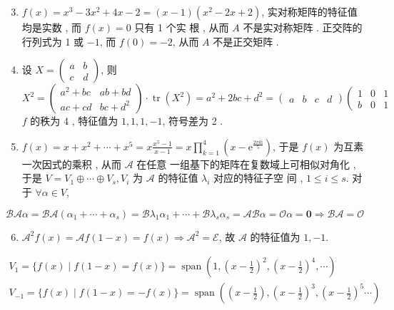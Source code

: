 \documentclass[10pt]{article}
\begin{document}
\begin{enumerate}
  \setcounter{enumi}{2}
  \item $f(x)=x^{3}-3 x^{2}+4 x-2=(x-1)\left(x^{2}-2 x+2\right)$,  实对称矩阵的特征值均是实数 ,  而  $f(x)=0$  只有  1  个实   根 ,  从而  $A$  不是实对称矩阵 .  正交阵的行列式为  1  或  $-1$,  而  $f(0)=-2$,  从而  $A$  不是正交矩阵 .

  \item  设  $X=\left(\begin{array}{ll}a & b \\ c & d\end{array}\right)$,  则  $X^{2}=\left(\begin{array}{cc}a^{2}+b c & a b+b d \\ a c+c d & b c+d^{2}\end{array}\right) \cdot \operatorname{tr}\left(X^{2}\right)=a^{2}+2 b c+d^{2}=\left(\begin{array}{llll}a & b & c & d\end{array}\right)\left(\begin{array}{ccc}1 & 0 & 1 \\ b & 0 & 1\end{array}\right.$ $f$  的秩为  4 ,  特征值为  $1,1,1,-1$,  符号差为  2 .

  \item $f(x)=x+x^{2}+\cdots+x^{5}=x \frac{x^{5}-1}{x-1}=x \prod_{k=1}^{4}\left(x-\mathrm{e}^{\frac{2 \pi k \mathrm{i}}{5}}\right)$,  于是  $f(x)$  为互素一次因式的乘积 ,  从而  $\mathscr{A}$  在任意   一组基下的矩阵在复数域上可相似对角化 ,  于是  $V=V_{1} \oplus \cdots \oplus V_{s}, V_{i}$  为  $\mathscr{A}$  的特征值  $\lambda_{i}$  对应的特征子空   间 , $1 \leq i \leq s$.  对于  $\forall \alpha \in V$,

\end{enumerate}
$$
\mathscr{B} \mathscr{A} \alpha=\mathscr{B} \mathscr{A}\left(\alpha_{1}+\cdots+\alpha_{s}\right)=\mathscr{B} \lambda_{1} \alpha_{1}+\cdots+\mathscr{B} \lambda_{s} \alpha_{s}=\mathscr{A} \mathscr{B} \alpha=\mathscr{O} \alpha=\mathbf{0} \Longrightarrow \mathscr{B} \mathscr{A}=\mathscr{O}
$$

\begin{enumerate}
  \setcounter{enumi}{5}
  \item $\mathscr{A}^{2} f(x)=\mathscr{A} f(1-x)=f(x) \Longrightarrow \mathscr{A}^{2}=\mathscr{E}$,  故  $\mathscr{A}$  的特征值为  $1,-1$.
\end{enumerate}
$$
\begin{gathered}
V_{1}=\{f(x) \mid f(1-x)=f(x)\}=\operatorname{span}\left(1,\left(x-\frac{1}{2}\right)^{2},\left(x-\frac{1}{2}\right)^{4}, \cdots\right) \\
V_{-1}=\{f(x) \mid f(1-x)=-f(x)\}=\operatorname{span}\left(\left(x-\frac{1}{2}\right),\left(x-\frac{1}{2}\right)^{3},\left(x-\frac{1}{2}\right)^{5} \cdots\right)
\end{gathered}
$$
\end{document}

